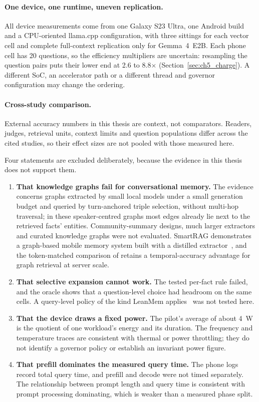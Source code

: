 \paragraph{One device, one runtime, uneven replication.}
All device measurements come from one Galaxy S23 Ultra, one Android build and a CPU-oriented
llama.cpp configuration, with three sittings for each vector cell and complete full-context
replication only for Gemma~4~E2B. Each phone cell has 20 questions, so the efficiency multipliers
are uncertain: resampling the question pairs puts their lower end at 2.6 to 8.8$\times$
(Section~\ref{sec:ch5_charge}). A different SoC, an accelerator path or a different thread and
governor configuration may change the ordering.

\paragraph{Cross-study comparison.}
External accuracy numbers in this thesis are context, not comparators. Readers, judges, retrieval
units, context limits and question populations differ across the cited studies, so their effect sizes
are not pooled with those measured here.

Four statements are excluded deliberately, because the evidence in this thesis does not support them.

\begin{enumerate}
  \item \textbf{That knowledge graphs fail for conversational memory.} The evidence concerns graphs
        extracted by small local models under a small generation budget and queried by turn-anchored
        triple selection, without multi-hop traversal; in these speaker-centred graphs most edges already
        lie next to the retrieved facts' entities. Community-summary designs, much larger extractors
        and curated knowledge graphs were not evaluated. SmartRAG demonstrates a graph-based mobile
        memory system built with a distilled extractor~\citep{smartrag}, and the token-matched
        comparison of \citet{rag_vs_graphrag} retains a temporal-accuracy advantage for graph
        retrieval at server scale.
  \item \textbf{That selective expansion cannot work.} The tested per-fact rule failed, and the
        oracle shows that a question-level choice had headroom on the same cells. A query-level
        policy of the kind LeanMem applies~\citep{leanmem} was not tested here.
  \item \textbf{That the device draws a fixed power.} The pilot's average of about 4~W is the
        quotient of one workload's energy and its duration. The frequency and temperature traces are
        consistent with thermal or power throttling; they do not identify a governor policy or
        establish an invariant power figure.
  \item \textbf{That prefill dominates the measured query time.} The phone logs record total query
        time, and prefill and decode were not timed separately. The relationship between prompt
        length and query time is consistent with prompt processing dominating, which is weaker than
        a measured phase split.
\end{enumerate}

